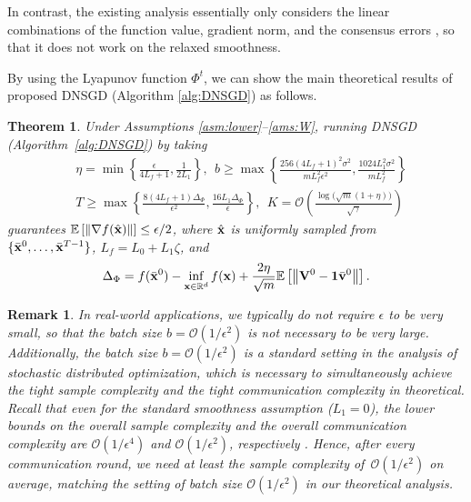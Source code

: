 \documentclass[sigconf]{acmart}
\newcommand{\Norm}[1]{\left\| #1 \right\|}
\def\vone{{\bf{1}}}
\def\vv{{\bf{v}}}
\def\vx{{\bf{x}}}
\def\fO{{\mathcal{O}}}
\def\BE{{\mathbb{E}}}
\def\BR{{\mathbb{R}}}
\def\mV {{\bf V}}
\theoremstyle{plain}
\newtheorem{thm}{Theorem}%
\newtheorem{remark}{Remark}
\def\bx{{\bar\vx}}
\def\bv{{\bar\vv}}
\begin{document}
In contrast, the existing analysis essentially only considers the linear combinations of the function value, gradient norm, and the consensus errors \citep{song2024optimal,xin2020general,hendrikx2021optimal,li2022variance,metelev2024decentralized,liu2024decentralized,luo2022complexity,ye2023multi,bai2024complexity,yuan2022revisiting,lu2021optimal,lan2020communication,kovalev2024lower,lin2023decentralized,sahinoglu2024online,li2024problem}, so that
it does not work on the relaxed smoothness. 

By using the Lyapunov function $\Phi^t$, we can show the main theoretical results of proposed DNSGD (Algorithm \ref{alg:DNSGD}) as follows.

\begin{thm}\label{thm:main}
    Under Assumptions \ref{asm:lower}--\ref{ams:W}, running DNSGD (Algorithm~\ref{alg:DNSGD}) by taking 
    \begin{align*}
        & \eta = \min\left\{\frac{\epsilon}{4L_f+1}, \frac{1}{2L_1}\right\},~~ 
        b \geq \max\left\{\frac{256(4L_f+1)^2\sigma^2}{mL_f^2\epsilon^2},  \frac{1024L_1^2\sigma^2}{m L_f^2}\right\}
        \\
        & T \geq \max\left\{\frac{8(4L_f+1)\Delta_{\Phi}}{\epsilon^2}, \frac{16L_1\Delta_{\Phi}}{\epsilon}\right\},~~ 
        K = \fO\left(\frac{\log {(\sqrt{m}(1+\eta)})}{\sqrt{\gamma}}\right)
    \end{align*}
    guarantees $\BE\left[\Norm{\nabla f(\hat\vx)}\right] \leq \epsilon/2$, where $\hat\vx$ is uniformly sampled from~$\{\bx^0,\dots,\bx^{T-1}\}$, $L_f=L_0+L_1\zeta$, and
    \begin{align*} 
    \Delta_{\Phi} = f(\bx^0) - \inf_{\vx\in\BR^d} f(\vx) + \frac{2\eta}{\sqrt{m}}\BE\left[\Norm{\mV^0-\vone\bv^0}\right]. 
    \end{align*}
\end{thm}

\begin{remark}
In real-world applications, we typically do not require $\epsilon$ to be very small, so that the batch size $b=\fO(1/\epsilon^2)$ is not necessary to be very large.
Additionally, the batch size $b=\fO(1/\epsilon^2)$ is a standard setting in the analysis of stochastic distributed optimization, which is necessary to simultaneously achieve the tight sample complexity and the tight communication complexity in theoretical. 
Recall that even for the standard smoothness assumption ($L_1=0$), the lower bounds on the overall sample complexity and the overall communication complexity are $\fO(1/\epsilon^4)$ and $\fO(1/\epsilon^2)$, respectively \cite{lu2021optimal,yuan2016convergence}. 
Hence, after every communication round, we need at least the sample complexity of~$\fO(1/\epsilon^2)$ on average, matching the setting of batch size $\fO(1/\epsilon^2)$ in our theoretical analysis.    
\end{remark}
\end{document}

